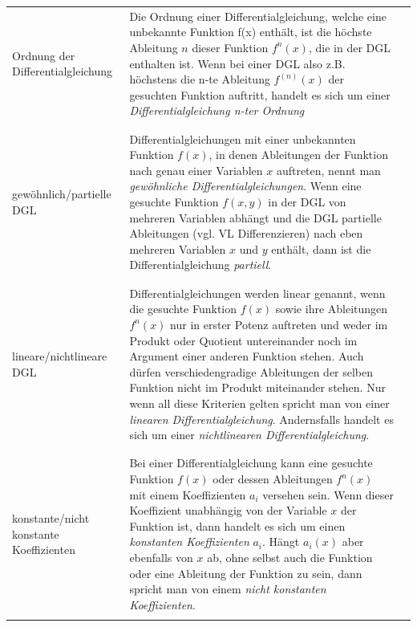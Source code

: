 \documentclass[a4paper,11pt]{article}
\theoremstyle{remark}
\begin{document}
\begin{flushleft}
\begin{tabular}[h]{l|p{9.6cm}r}

Ordnung der Differentialgleichung & Die Ordnung einer Differentialgleichung, welche eine unbekannte Funktion f(x) enthält, ist die höchste Ableitung $n$ dieser Funktion $f^n(x)$, die in der DGL enthalten ist. Wenn bei einer DGL also z.B. höchstens die n-te Ableitung $f^{(n)}(x)$ der gesuchten Funktion auftritt, handelt es sich um einer \textit{Differentialgleichung n-ter Ordnung}\\ \\ \cline{1-2}
\\ gewöhnlich/partielle DGL & Differentialgleichungen mit einer unbekannten Funktion $f(x)$, in denen Ableitungen der Funktion nach genau einer Variablen $x$ auftreten, nennt man \textit{gewöhnliche Differentialgleichungen}. Wenn eine gesuchte Funktion $f(x,y)$ in der DGL von mehreren Variablen abhängt und die DGL partielle Ableitungen (vgl. VL Differenzieren) nach eben mehreren Variablen $x$ und $y$ enthält, dann ist die Differentialgleichung \textit{partiell}.\\ \\ \cline{1-2}
\\ lineare/nichtlineare DGL & Differentialgleichungen werden linear genannt, wenn die gesuchte Funktion $f(x)$ sowie ihre Ableitungen $f^n(x)$ nur in erster Potenz auftreten und weder im Produkt oder Quotient untereinander noch im Argument einer anderen Funktion stehen. Auch dürfen verschiedengradige Ableitungen der selben Funktion nicht im Produkt miteinander stehen. Nur wenn all diese Kriterien gelten spricht man von einer \textit{linearen Differentialgleichung}. Andernsfalls handelt es sich um einer \textit{nichtlinearen Differentialgleichung}.\\ \\ \cline{1-2}
\\ konstante/nicht konstante Koeffizienten & Bei einer Differentialgleichung kann eine gesuchte Funktion $f(x)$ oder dessen Ableitungen $f^n(x)$ mit einem Koeffizienten $a_i$ versehen sein. Wenn dieser Koeffizient unabhängig von der Variable $x$ der Funktion ist, dann handelt es sich um einen \textit{konstanten Koeffizienten} $a_i$. Hängt $a_i(x)$ aber ebenfalls von $x$ ab, ohne selbst auch die Funktion oder eine Ableitung der Funktion zu sein, dann spricht man von einem \textit{nicht konstanten Koeffizienten}.\\ \\ \cline{1-2}

\end{tabular}
\end{flushleft}
\end{document}

